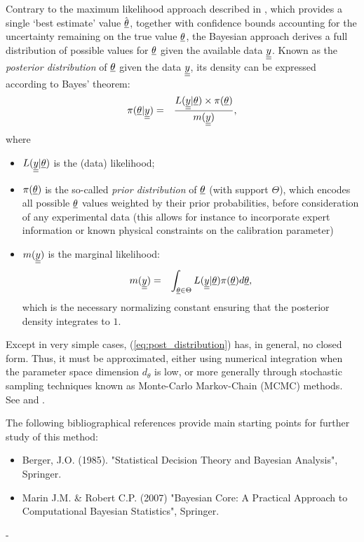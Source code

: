 {  Contrary to the maximum likelihood approach described in ,
  which provides a single `best estimate' value $\hat{{\underline{\theta}}}$, together with confidence bounds accounting for the uncertainty
  remaining on the true value ${\underline{\theta}}$, the Bayesian approach derives a full distribution of possible values for ${\underline{\theta}}$
  given the available data ${\underline{\underline{y}}}$. Known as the {\em posterior distribution} of ${\underline{\theta}}$ given the data ${\underline{\underline{y}}}$,
  its density can be expressed according
  to Bayes' theorem:
  \begin{align}\label{eq:post_distribution}
    \pi({\underline{\theta}} | {\underline{\underline{y}}}) &=& \frac{L({\underline{\underline{y}}} | {\underline{\theta}}) \times \pi({\underline{\theta}})}{m({\underline{\underline{y}}})},
  \end{align}
  where
  \begin{itemize}
  \item $L({\underline{\underline{y}}} | {\underline{\theta}})$ is the (data) likelihood;
  \item $\pi({\underline{\theta}})$ is the so-called {\em prior distribution} of ${\underline{\theta}}$ (with support $\Theta$),
    which encodes all possible ${\underline{\theta}}$ values weighted by their prior probabilities, before consideration of any experimental data
    (this allows for instance to incorporate expert information or known physical constraints on the calibration parameter)
  \item $m({\underline{\underline{y}}})$ is the marginal likelihood:
    \begin{align*}
      m({\underline{\underline{y}}}) &=& \displaystyle\int_{{\underline{\theta}}\in\Theta} L({\underline{\underline{y}}} | {\underline{\theta}}) \pi({\underline{\theta}}) d{\underline{\theta}},
    \end{align*}
    which is the necessary normalizing constant ensuring that the posterior density integrates to $1$.
  \end{itemize}

  Except in very simple cases, (\ref{eq:post_distribution}) has, in general, no closed form. Thus, it must be approximated, either using numerical integration when the parameter space dimension $d_\theta$ is low,
  or more generally through stochastic sampling techniques known as Monte-Carlo Markov-Chain (MCMC) methods.
  See  and .

  The following bibliographical references provide main starting points for further study of  this method:
  \begin{itemize}
  \item Berger, J.O. (1985). "Statistical Decision Theory and Bayesian Analysis", Springer.
  \item Marin J.M. \& Robert C.P. (2007) "Bayesian Core: A Practical Approach to Computational Bayesian Statistics", Springer.
  \end{itemize}
}
{
-
}
